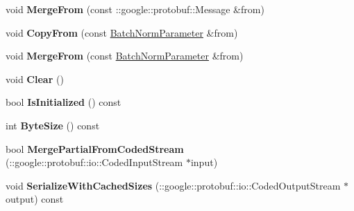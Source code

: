 \begin{DoxyCompactItemize}
\item 
\mbox{\label{classcaffe_1_1_batch_norm_parameter_a363b3b6d815c1e23c230a6b00c730e7e}} 
void {\bfseries Merge\+From} (const \+::google\+::protobuf\+::\+Message \&from)
\item 
\mbox{\label{classcaffe_1_1_batch_norm_parameter_a04d6d7f6416671f18d931562ec5e2b6c}} 
void {\bfseries Copy\+From} (const \mbox{\hyperlink{classcaffe_1_1_batch_norm_parameter}{Batch\+Norm\+Parameter}} \&from)
\item 
\mbox{\label{classcaffe_1_1_batch_norm_parameter_a112d0a7818c3642bf421ba471a749d15}} 
void {\bfseries Merge\+From} (const \mbox{\hyperlink{classcaffe_1_1_batch_norm_parameter}{Batch\+Norm\+Parameter}} \&from)
\item 
\mbox{\label{classcaffe_1_1_batch_norm_parameter_ad3f290ee4bceb818cb3c748817c20c50}} 
void {\bfseries Clear} ()
\item 
\mbox{\label{classcaffe_1_1_batch_norm_parameter_a8dd10cfd3cebc924cdcb6bbefb79d67d}} 
bool {\bfseries Is\+Initialized} () const
\item 
\mbox{\label{classcaffe_1_1_batch_norm_parameter_a10432515b7919ec035f517cbc5d8c9a8}} 
int {\bfseries Byte\+Size} () const
\item 
\mbox{\label{classcaffe_1_1_batch_norm_parameter_a07f7dd4c212b19d99954515621f01082}} 
bool {\bfseries Merge\+Partial\+From\+Coded\+Stream} (\+::google\+::protobuf\+::io\+::\+Coded\+Input\+Stream $\ast$input)
\item 
\mbox{\label{classcaffe_1_1_batch_norm_parameter_ad6d1ebec1fb50acafb1860793cbc9f0c}} 
void {\bfseries Serialize\+With\+Cached\+Sizes} (\+::google\+::protobuf\+::io\+::\+Coded\+Output\+Stream $\ast$output) const
\item 
\mbox{\label{classcaffe_1_1_batch_norm_parameter_acc3b9c95d0589a76f2aff155401ba8b3}} 

\end{DoxyCompactItemize}

